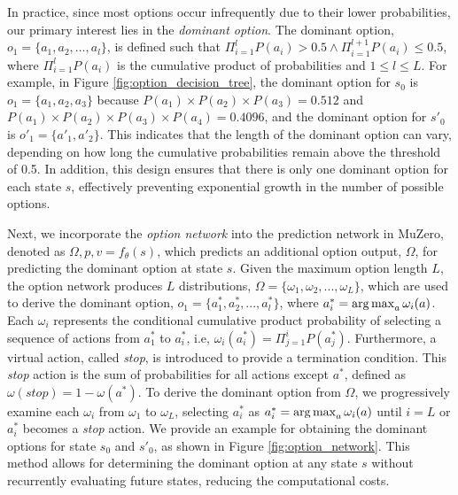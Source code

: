 In practice, since most options occur infrequently due to their lower probabilities, our primary interest lies in the \textit{dominant option}.
The dominant option, $o_1=\{a_1, a_2, ..., a_l\}$, is defined such that $\Pi_{i=1}^lP(a_i)>0.5 \land \Pi_{i=1}^{l+1}P(a_i)\leq0.5$, where $\Pi_{i=1}^lP(a_i)$ is the cumulative product of probabilities and $1\leq l\leq L$.
For example, in Figure \ref{fig:option_decision_tree}, the dominant option for $s_0$ is $o_1=\{a_1, a_2, a_3\}$ because $P(a_1)\times P(a_2)\times P(a_3) =0.512$ and $P(a_1)\times P(a_2)\times P(a_3)\times P(a_4) = 0.4096$, and the dominant option for $s'_0$ is $o'_1=\{a'_1, a'_2\}$.
This indicates that the length of the dominant option can vary, depending on how long the cumulative probabilities remain above the threshold of 0.5.
In addition, this design ensures that there is only one dominant option for each state $s$, effectively preventing exponential growth in the number of possible options.

Next, we incorporate the \textit{option network} into the prediction network in MuZero, denoted as $\Omega, p, v=f_\theta(s)$, which predicts an additional option output, $\Omega$, for predicting the dominant option at state $s$.
Given the maximum option length $L$, the option network produces $L$ distributions, $\Omega=\{\omega_1, \omega_2, ..., \omega_L\}$, which are used to derive the dominant option, $o_1=\{a^*_1, a^*_2, ..., a^*_l\}$, where $a^*_i=\operatorname*{arg\,max}_a \omega_i(a)$.
Each $\omega_i$ represents the conditional cumulative product probability of selecting a sequence of actions from $a^*_1$ to $a^*_i$, i.e, $\omega_i(a^*_i)=\Pi_{j=1}^iP(a^*_j)$.
Furthermore, a virtual action, called \textit{stop}, is introduced to provide a termination condition.
This \textit{stop} action is the sum of probabilities for all actions except $a^*$, defined as $\omega(stop)=1-\omega(a^*)$.
To derive the dominant option from $\Omega$, we progressively examine each $\omega_i$ from $\omega_1$ to $\omega_L$, selecting $a^*_i$ as $a^*_i=\operatorname*{arg\,max}_a \omega_i(a)$ until $i=L$ or $a^*_i$ becomes a \textit{stop} action.
We provide an example for obtaining the dominant options for state $s_0$ and $s'_0$, as shown in Figure \ref{fig:option_network}.
This method allows for determining the dominant option at any state $s$ without recurrently evaluating future states, reducing the computational costs.


